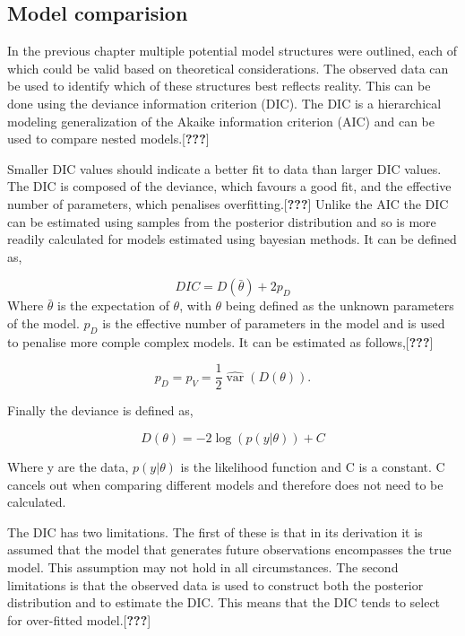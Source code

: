 \documentclass[11pt,twoside]{bristolthesis}
\begin{document}
  \hypertarget{model-comparision}{%
  \subsection{Model comparision}\label{model-comparision}}
  
  In the previous chapter multiple potential model structures were outlined, each of which could be valid based on theoretical considerations. The observed data can be used to identify which of these structures best reflects reality. This can be done using the deviance information criterion (DIC). The DIC is a hierarchical modeling generalization of the Akaike information criterion (AIC) and can be used to compare nested models.{[}{\textbf{???}}{]}
  
  Smaller DIC values should indicate a better fit to data than larger DIC values. The DIC is composed of the deviance, which favours a good fit, and the effective number of parameters, which penalises overfitting.{[}{\textbf{???}}{]} Unlike the AIC the DIC can be estimated using samples from the posterior distribution and so is more readily calculated for models estimated using bayesian methods. It can be defined as,
  
  \[ {\mathit  {DIC}}=D({\bar  {\theta }})+2p_{D}\]
  Where \(\bar{\theta}\) is the expectation of \(\theta\), with \(\theta\) being defined as the unknown parameters of the model. \(p_{D}\) is the effective number of parameters in the model and is used to penalise more comple complex models. It can be estimated as follows,{[}{\textbf{???}}{]}
  
  \[p_{D}=p_{V}={\frac  {1}{2}}\widehat {\operatorname {var}}\left(D(\theta )\right).\]
  
  Finally the deviance is defined as,
  
  \[D(\theta)=-2\log(p(y|\theta ))+C\]
  
  Where y are the data, \(\displaystyle p(y|\theta)\) is the likelihood function and C is a constant. C cancels out when comparing different models and therefore does not need to be calculated.
  
  The DIC has two limitations. The first of these is that in its derivation it is assumed that the model that generates future observations encompasses the true model. This assumption may not hold in all circumstances. The second limitations is that the observed data is used to construct both the posterior distribution and to estimate the DIC. This means that the DIC tends to select for over-fitted model.{[}{\textbf{???}}{]}
  
\end{document}

